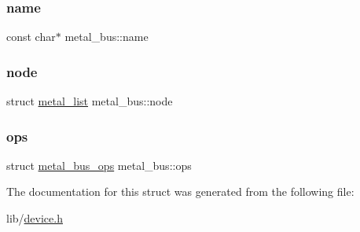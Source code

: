 \subsubsection{\texorpdfstring{name}{name}}
{\footnotesize\ttfamily const char$\ast$ metal\+\_\+bus\+::name}

\mbox{\label{structmetal__bus_a1af389eaabcb3daa33e7794acfbe446b}} 
\subsubsection{\texorpdfstring{node}{node}}
{\footnotesize\ttfamily struct \hyperlink{structmetal__list}{metal\+\_\+list} metal\+\_\+bus\+::node}

\mbox{\label{structmetal__bus_ad42ebfcf7b0971f28fad6992a8e4c8fd}} 
\subsubsection{\texorpdfstring{ops}{ops}}
{\footnotesize\ttfamily struct \hyperlink{structmetal__bus__ops}{metal\+\_\+bus\+\_\+ops} metal\+\_\+bus\+::ops}



The documentation for this struct was generated from the following file\+:\begin{DoxyCompactItemize}
\item 
lib/\hyperlink{device_8h}{device.\+h}\end{DoxyCompactItemize}
